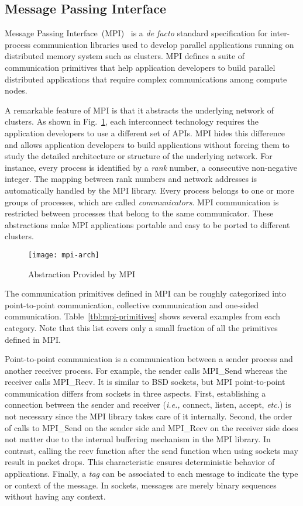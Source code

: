 \subsection{Message Passing Interface}\label{sec:i-mpi}

Message Passing Interface~(MPI)~\autocite{MessagePassingInterfaceForum2015} is
a \emph{de facto} standard specification for inter-process communication
libraries used to develop parallel applications running on distributed memory
system such as clusters. MPI defines a suite of communication primitives that
help application developers to build parallel distributed applications that
require complex communications among compute nodes.

A remarkable feature of MPI is that it abstracts the underlying network
of clusters. As shown in Fig.~\ref{fig:mpi-arch}, each interconnect technology
requires the application developers to use a different set of APIs. MPI hides
this difference and allows application developers to build applications
without forcing them to study the detailed architecture or structure of the
underlying network. For instance, every process is identified by a \emph{rank}
number, a consecutive non-negative integer. The mapping between rank numbers
and network addresses is automatically handled by the MPI library. Every
process belongs to one or more groups of processes, which are called
\emph{communicators}. MPI communication is restricted between processes that
belong to the same communicator. These abstractions make MPI applications
portable and easy to be ported to different clusters.

\begin{figure}
    \centering
    \texttt{[image: mpi-arch]}
    \caption{Abstraction Provided by MPI}%
    \label{fig:mpi-arch}
\end{figure}

The communication primitives defined in MPI can be roughly categorized into
point-to-point communication, collective communication and one-sided
communication. Table~\ref{tbl:mpi-primitives} shows several examples from each
category. Note that this list covers only a small fraction of all the
primitives defined in MPI\@.

Point-to-point communication is a communication between a sender process and
another receiver process. For example, the sender calls MPI\_Send whereas the
receiver calls MPI\_Recv. It is similar to BSD sockets, but MPI point-to-point
communication differs from sockets in three aspects. First, establishing a
connection between the sender and receiver (\emph{i.e.,} connect, listen,
accept, \emph{etc.}) is not necessary since the MPI library takes care of it
internally. Second, the order of calls to MPI\_Send on the sender side and
MPI\_Recv on the receiver side does not matter due to the internal
buffering mechanism in the MPI library. In contrast, calling the recv function
after the send function when using sockets may result in packet drops. This
characteristic ensures deterministic behavior of applications. Finally, a
\emph{tag} can be associated to each message to indicate the type or context
of the message. In sockets, messages are merely binary sequences without
having any context.

